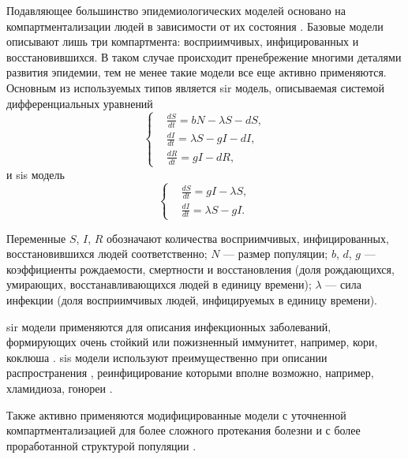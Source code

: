 \documentclass[a4paper,12pt]{article} %
\begin{document}
Подавляющее большинство эпидемиологических моделей основано на компартментализации людей в зависимости от их состояния \cite{keeling2005networks,kermack1927contribution,bailey1957mathematical,anderson1992may}. Базовые модели описывают лишь три компартмента: восприимчивых, инфицированных и восстановившихся. В таком случае происходит пренебрежение многими деталями развития эпидемии, тем не менее такие модели все еще активно применяются. Основным из используемых типов является \gls{sir} модель, описываемая системой дифференциальных уравнений
\begin{equation}
    \left\{
    \begin{aligned}
    & \frac{dS}{dt}=bN-\lambda S-dS, \\
    & \frac{dI}{dt}=\lambda S-gI-dI, \\
    & \frac{dR}{dt}=gI-dR,
    \end{aligned}
    \right.
\end{equation}
и \gls{sis} модель
\begin{equation}
    \left\{
    \begin{aligned}
        & \frac{dS}{dt} = gI-\lambda S, \\
        & \frac{dI}{dt} = \lambda S - gI.
    \end{aligned}
    \right.
\end{equation}

Переменные $S$, $I$, $R$ обозначают количества восприимчивых, инфицированных, восстановившихся людей соответственно; $N$ --- размер популяции; $b$, $d$, $g$ --- коэффициенты рождаемости, смертности и восстановления (доля рождающихся, умирающих, восстанавливающихся людей в единицу времени); $\lambda$ --- сила инфекции (доля восприимчивых людей, инфицируемых в единицу времени).

\gls{sir} модели применяются для описания инфекционных заболеваний, формирующих очень стойкий или пожизненный иммунитет, например, кори, коклюша \cite{keeling2005networks,kermack1927contribution,anderson1992may,grenfell1992chance,rohani2000impact}. \gls{sis} модели используют преимущественно при описании распространения , реинфицирование которыми вполне возможно, например, хламидиоза, гонореи \cite{keeling2005networks,hethcote1984springer,garnett1996sexually}.

Также активно применяются модифицированные модели с уточненной компартментализацией для более сложного протекания болезни \cite{keeling2005networks, anderson1988epidemiology, grenfell2001travelling} и с более проработанной структурой популяции \cite{hethcote1984springer, ghani1997role, keeling1997modelling}.
\end{document}
